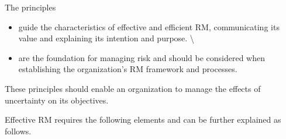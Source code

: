 \documentclass[letterpaper,10pt,english]{jupyterBook}
\begin{document}
\sphinxAtStartPar
The principles
\begin{itemize}
\item {} 
\sphinxAtStartPar
guide the characteristics of effective and efficient RM, communicating its value and explaining its intention and purpose. \textbackslash{}

\item {} 
\sphinxAtStartPar
are the foundation for managing risk and should be considered when establishing the organization’s RM framework and processes.

\end{itemize}

\sphinxAtStartPar
These principles should enable an organization to manage the effects of uncertainty on its objectives.

\sphinxAtStartPar
Effective RM requires the following elements and can be further explained as follows.
\end{document}
